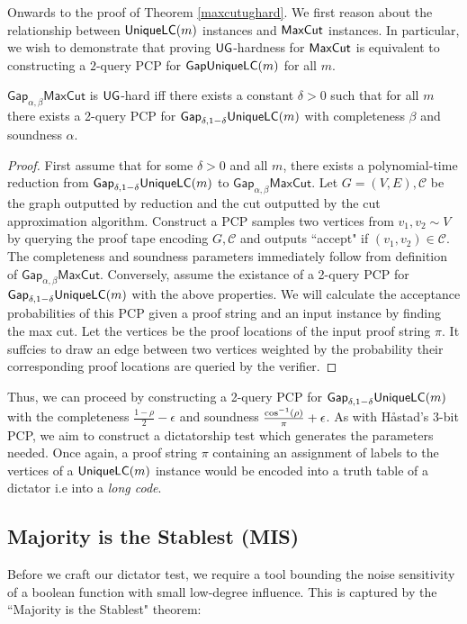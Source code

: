 Onwards to the proof of Theorem \ref{maxcutughard}. We first reason about the relationship between $\mathsf{UniqueLC}(m)$ instances and $\mathsf{MaxCut}$ instances. In particular, we wish to demonstrate that proving $\mathsf{UG}$-hardness for $\mathsf{MaxCut}$ is equivalent to constructing a $2$-query PCP for $\mathsf{GapUniqueLC}(m)$ for all $m$.

\begin{theorem}
  $\mathsf{Gap}_{\alpha,\beta}\mathsf{MaxCut}$ is $\mathsf{UG}$-hard iff there exists a constant $\delta > 0$ such that for all $m$ there exists a 2-query PCP for $\mathsf{Gap}_{\delta, 1-\delta}\mathsf{UniqueLC}(m)$ with completeness $\beta$ and soundness $\alpha$.
\end{theorem}
%
\begin{proof}
  First assume that for some $\delta > 0$ and all $m$, there exists a polynomial-time reduction from $\mathsf{Gap}_{\delta, 1-\delta}\mathsf{UniqueLC}(m)$ to $\mathsf{Gap}_{\alpha,\beta}\mathsf{MaxCut}$. Let $G=(V,E), \mathcal{C}$ be the graph outputted by reduction and the cut outputted by the cut approximation algorithm. Construct a PCP samples two vertices from $v_1, v_2 \sim V$ by querying the proof tape encoding $G,\mathcal{C}$ and outputs ``accept" if $(v_1,v_2) \in \mathcal{C}$. The completeness and soundness parameters immediately follow from definition of $\mathsf{Gap}_{\alpha,\beta}\mathsf{MaxCut}$. Conversely, assume the existance of a 2-query PCP for $\mathsf{Gap}_{\delta, 1-\delta}\mathsf{UniqueLC}(m)$ with the above properties. We will calculate the acceptance probabilities of this PCP given a proof string and an input instance by finding the max cut. Let the vertices be the proof locations of the input proof string $\pi$. It suffcies to draw an edge between two vertices weighted by the probability their corresponding proof locations are queried by the verifier.
\end{proof}

Thus, we can proceed by constructing a 2-query PCP for $\mathsf{Gap}_{\delta, 1-\delta}\mathsf{UniqueLC}(m)$ with the completeness $\frac{1-\rho}{2} - \epsilon$ and soundness $\frac{\cos^{-1}(\rho)}{\pi} + \epsilon$. As with H\aa stad's 3-bit PCP, we aim to construct a dictatorship test which generates the parameters needed. Once again, a proof string $\pi$ containing an assignment of labels to the vertices of a $\mathsf{UniqueLC}(m)$ instance would be encoded into a truth table of a dictator i.e into a \emph{long code}. \newline

%
%
%
\subsection{Majority is the Stablest (MIS)}
%
Before we craft our dictator test, we require a tool bounding the noise sensitivity of a boolean function with small low-degree influence. This is captured by the ``Majority is the Stablest" theorem:

